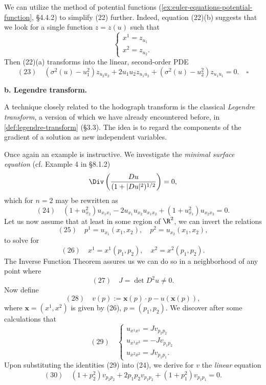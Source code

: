 \begin{remark}
\label{rem:hodograph-potential-simplification}
We can utilize the method of potential functions (\cref{ex:euler-equations-potential-function}, \S4.4.2) to simplify (22) further. Indeed, equation (22)(b) suggests that we look for a single function $z=z(u)$ such that
$$\begin{cases} x^1 = z_{u_1} \\ x^2 = z_{u_2}. \end{cases}$$
Then (22)(a) transforms into the linear, second-order PDE
$$(23) \quad (\sigma^2(u)-u_1^2)z_{u_2u_2} + 2u_1u_2 z_{u_1u_2} + (\sigma^2(u)-u_2^2)z_{u_1u_1} = 0. \quad \square$$
\end{remark}

\textbf{b. Legendre transform.}

\begin{example}
\label{ex:legendre-transform-minimal-surface}
A technique closely related to the hodograph transform is the classical \textit{Legendre transform}, a version of which we have already encountered before, in \cref{def:legendre-transform} (\S3.3). The idea is to regard the components of the gradient of a solution as new independent variables.

Once again an example is instructive. We investigate the \textit{minimal surface equation} (cf. Example 4 in §8.1.2)
$$\Div\left(\frac{Du}{(1+|Du|^2)^{1/2}}\right) = 0,$$
which for $n=2$ may be rewritten as
$$(24) \quad (1+u_{x_2}^2)u_{x_1x_1} - 2u_{x_1}u_{x_2}u_{x_1x_2} + (1+u_{x_1}^2)u_{x_2x_2} = 0.$$
Let us now assume that at least in some region of $\R^2$, we can invert the relations
$$(25) \quad p^1 = u_{x_1}(x_1,x_2), \quad p^2 = u_{x_2}(x_1,x_2),$$
to solve for
$$(26) \quad x^1 = x^1(p_1,p_2), \quad x^2 = x^2(p_1,p_2).$$
The Inverse Function Theorem assures us we can do so in a neighborhood of any point where
$$(27) \quad J = \det D^2u \neq 0.$$
Now define
$$(28) \quad v(p) := \mathbf{x}(p) \cdot p - u(\mathbf{x}(p)),$$
where $\mathbf{x} = (x^1, x^2)$ is given by (26), $p = (p_1, p_2)$. We discover after some calculations that
$$(29) \quad \begin{cases} u_{x^1 x^1} = Jv_{p_2 p_2} \\ u_{x^1 x^2} = -Jv_{p_1 p_2} \\ u_{x^2 x^2} = Jv_{p_1 p_1}. \end{cases}$$
Upon substituting the identities (29) into (24), we derive for $v$ the \textit{linear} equation
$$(30) \quad (1 + p_2^2)v_{p_2 p_2} + 2p_1 p_2 v_{p_1 p_2} + (1 + p_1^2)v_{p_1 p_1} = 0.$$
\end{example}

